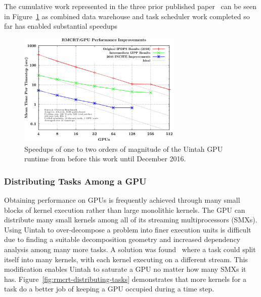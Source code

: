 \documentclass[12pt]{article}
\begin{document}
The cumulative work represented in the three prior published paper~\cite{wolfhpc15,ijpp16,espm2-brad} can be seen in Figure~\ref{fig:rmcrt-cumulative} as combined data warehouse and task scheduler work completed so far has enabled substantial speedups

\begin{figure}
	\centering
	\includegraphics[width=0.70\textwidth]{figures/rmcrt-cumulative.png}
	\caption{Speedups of one to two orders of magnitude of the Uintah GPU runtime from before this work until December 2016.   }
	\label{fig:rmcrt-cumulative}
\end{figure}

\subsubsection{Distributing Tasks Among a GPU}
\label{ch:generalizing_task_execution}
Obtaining performance on GPUs is frequently achieved through many small blocks of kernel execution rather than large monolithic kernels.  The GPU can distribute many small kernels among all of its streaming multiprocessors (SMXs).  Using Uintah to over-decompose a problem into finer execution units is difficult due to finding a suitable decomposition geometry and increased dependency analysis among many more tasks.  A solution was found~\cite{espm2-brad} where a task could split itself into many kernels, with each kernel executing on a different stream.  This modification enables Uintah to saturate a GPU no matter how many SMXs it has.   Figure~\ref{fig:rmcrt-distributing-tasks} demonstrates that more kernels for a task do a better job of keeping a GPU occupied during a time step.    
\end{document}
